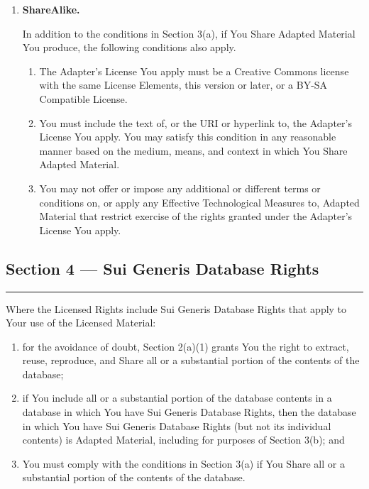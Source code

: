 \begin{enumerate}[label=(\alph*), leftmargin=1.8em, labelwidth=1.5em, align=left, itemsep=0.6em]
	\item \textbf{ShareAlike.}

	      In addition to the conditions in Section 3(a), if You Share Adapted Material You produce, the following conditions also apply.

	      \begin{enumerate}[label=\arabic*., leftmargin=1.8em, labelwidth=1.2em, align=left, itemsep=0.4em]
		      \item The Adapter's License You apply must be a Creative Commons license with the same License Elements, this version or later, or a BY-SA Compatible License.
		      \item You must include the text of, or the URI or hyperlink to, the Adapter's License You apply. You may satisfy this condition in any reasonable manner based on the medium, means, and context in which You Share Adapted Material.
		      \item You may not offer or impose any additional or different terms or conditions on, or apply any Effective Technological Measures to, Adapted Material that restrict exercise of the rights granted under the Adapter's License You apply.
	      \end{enumerate}
\end{enumerate}

\subsection*{Section 4 --- Sui Generis Database Rights}
\noindent\rule{\textwidth}{0.3pt}
\smallskip

Where the Licensed Rights include Sui Generis Database Rights that apply to Your use of the Licensed Material:

\begin{enumerate}[label=(\alph*), leftmargin=1.8em, labelwidth=1.5em, align=left, itemsep=0.4em]
	\item for the avoidance of doubt, Section 2(a)(1) grants You the right to extract, reuse, reproduce, and Share all or a substantial portion of the contents of the database;
	\item if You include all or a substantial portion of the database contents in a database in which You have Sui Generis Database Rights, then the database in which You have Sui Generis Database Rights (but not its individual contents) is Adapted Material, including for purposes of Section 3(b); and
	\item You must comply with the conditions in Section 3(a) if You Share all or a substantial portion of the contents of the database.
\end{enumerate}

